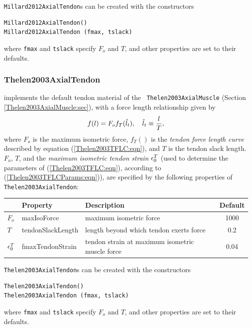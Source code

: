 {\tt Millard2012AxialTendon}s can be created with the constructors
\begin{lstlisting}[]
Millard2012AxialTendon()
Millard2012AxialTendon (fmax, tslack)
\end{lstlisting}
%
where {\tt fmax} and {\tt tslack} specify $F_{o}$ and $T$, and
other properties are set to their defaults.

\subsubsection{Thelen2003AxialTendon}

implements the default tendon material of the {\tt
Thelen2003AxialMuscle} (Section \ref{Thelen2003AxialMuscle:sec}),
with a force length relationship given by
%
\begin{equation}
f(l) = F_o f_T (\hat{l}_t), \quad \hat{l}_t \equiv \frac{l}{T},
\end{equation}
%
where $F_o$ is the maximum isometric force, $f_T()$ is the {\it tendon
force length curve} described by equation (\ref{Thelen2003TFLC:eqn}),
and $T$ is the tendon slack length. $F_o$, $T$, and the {\it maximum
isometric tendon strain} $\epsilon_0^T$ (used to determine the parameters
of (\ref{Thelen2003TFLC:eqn}), according to (\ref{Thelen2003TFLCParams:eqn})),
are specified by the following properties of {\tt
Thelen2003AxialTendon}:

\begin{center}
\begin{tabular}{|l|l|l|c|} 
\hline
& Property & Description & Default\\
\hline
$F_{o}$ & {\sf maxIsoForce} & 
maximum isometric force & 1000 \\
$T$ & {\sf tendonSlackLength} & 
length beyond which tendon exerts force & 0.2 \\
$\epsilon_0^T$ & {\sf fmaxTendonStrain} & 
tendon strain at maximum isometric muscle force & 0.04 \\
\hline
\end{tabular}
\end{center}

{\tt Thelen2003AxialTendon}s can be created with the constructors
\begin{lstlisting}[]
Thelen2003AxialTendon()
Thelen2003AxialTendon (fmax, tslack)
\end{lstlisting}
%
where {\tt fmax} and {\tt tslack} specify $F_{o}$ and $T$, and
other properties are set to their defaults.


